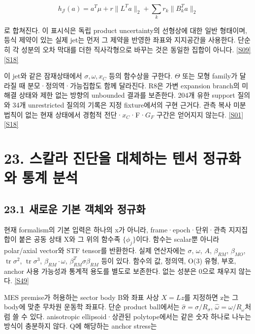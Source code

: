 \documentclass[11pt,a4paper]{article}
\begin{document}
\[
h_{\mathcal J}(a)=a^T\mu+r\|L^Ta\|_2+
\sum_k r_k\|B_k^Ta\|_2
\]

로 합쳐진다. 이 표시식은 독립 product uncertainty의 선형상에 대한 일반 형태이며, 등식 제약이 있는 실제 jet는 먼저 그 제약을 반영한 좌표와 지지공간을 사용한다. 단순히 각 성분의 오차 막대를 더한 직사각형으로 바꾸는 것은 동일한 집합이 아니다. \hyperlink{src:S09}{[S09]} \hyperlink{src:S18}{[S18]}


이 jet와 같은 잠재상태에서 \(\sigma,\omega,x_C\) 등의 함수상을 구한다. \(\Theta\) 또는 모형 family가 달라질 때 분모·정의역·가능집합도 함께 달라진다. R8은 가변 expansion branch의 미해결 상태와 제한 없는 방향의 unbounded 결과를 보존한다. 204개 유한 support 질의와 34개 unrestricted 질의의 기록은 지정 fixture에서의 구현 근거다. 관측 복사 미분법칙이 없는 현재 상태에서 경험적 전단·\(x_C\)·F·\(G_F\) 구간은 얻어지지 않는다. \hyperlink{src:S01}{[S01]} \hyperlink{src:S18}{[S18]}


\hypertarget{s23}{}

\section*{23. 스칼라 진단을 대체하는 텐서 정규화와 통계 분석}


\subsection*{23.1 새로운 기본 객체와 정규화}

현재 formalism의 기본 입력은 하나의 x가 아니라, frame·epoch·단위·관측 지지집합이 붙은 공동 상태 X와 그 위의 함수족 \(\{\phi_j\}\)이다. 함수는 scalar뿐 아니라 polar/axial vector와 STF tensor를 반환한다. 실제 연산자에는 \(\sigma\), \(\omega\), \(A\), \(\beta_{RM}\), \(\beta_{MO}\), \(\operatorname{tr}\sigma^2\), \(\operatorname{tr}\sigma^3\), \(\beta_{RM}\cdot\omega\), \(\beta_{RM}^T\sigma\beta_{RM}\) 등이 있다. 함수의 값, 정의역, O(3) 유형, 부호, anchor 사용 가능성과 통계적 용도를 별도로 보존한다. 없는 성분은 0으로 채우지 않는다. \hyperlink{src:S49}{[S49]}


MES premise가 허용하는 sector body B와 좌표 사상 \(X=Lz\)를 지정하면 z는 그 body에 맞춘 무차원 운동학 좌표다. 단순 product ball에서는 \(\widehat\sigma=\sigma/R_\sigma\), \(\widehat\omega=\omega/R_\omega\)처럼 쓸 수 있다. anisotropic ellipsoid·상관된 polytope에서는 같은 숫자 하나로 나누는 방식이 충분하지 않다. Q에 해당하는 anchor stress는
\end{document}
